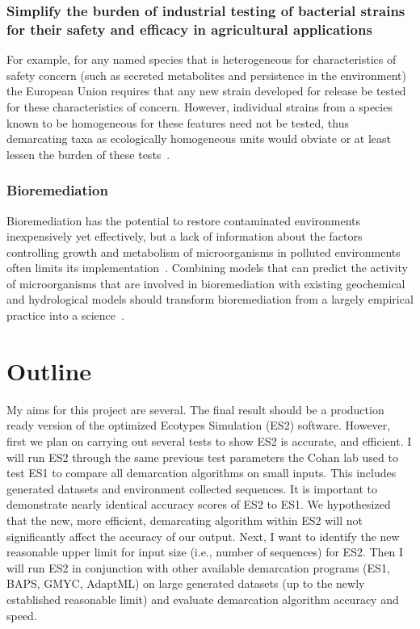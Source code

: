 \subsubsection*{Simplify the burden of industrial testing of bacterial strains for their safety and efficacy in agricultural applications}
For example, for any named species that is heterogeneous for characteristics of safety concern (such as secreted metabolites and persistence in the environment) the European Union requires that any new strain developed for release be tested for these characteristics of concern.
However, individual strains from a species known to be homogeneous for these features need not be tested, thus demarcating taxa as ecologically homogeneous units would obviate or at least lessen the burden of these tests~\cite{cohan2007systematics}.

\subsubsection*{Bioremediation}
Bioremediation has the potential to restore contaminated environments inexpensively yet effectively, but a lack of information about the factors controlling growth and metabolism of microorganisms in polluted environments often limits its implementation~\cite{lovley2003cleaning}.
Combining models that can predict the activity of microorganisms that are involved in bioremediation with existing geochemical and hydrological models should transform bioremediation from a largely empirical practice into a science~\cite{lovley2003cleaning}.


\section{Outline}
My aims for this project are several.
The final result should be a production ready version of the optimized Ecotypes Simulation (ES2) software.
However, first we plan on carrying out several tests to show ES2 is accurate, and efficient.
I will run ES2 through the same previous test parameters the Cohan lab used to test ES1 to compare all demarcation algorithms on small inputs.
This includes generated datasets and environment collected sequences.
It is important to demonstrate nearly identical accuracy scores of ES2 to ES1.
We hypothesized that the new, more efficient, demarcating algorithm within ES2 will not significantly affect the accuracy of our output.
Next, I want to identify the new reasonable upper limit for input size (i.e., number of sequences) for ES2.
Then I will run ES2 in conjunction with other available demarcation programs (ES1, BAPS, GMYC, AdaptML) on large generated datasets (up to the newly established reasonable limit) and evaluate demarcation algorithm accuracy and speed.

